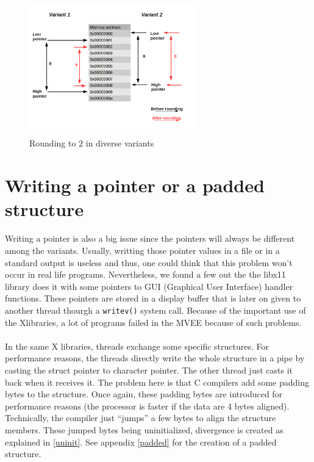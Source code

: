 \documentclass[english]{enstaPRE}
\begin{document}
\begin{figure}[t, centering]
 \centerline{\includegraphics[width=0.65\textwidth]{RoundUpMemory}}
 \caption{Rounding to 2 in diverse variants}
 \label{fig:rounding}
\end{figure}


\section{Writing a pointer or a padded structure}

Writing a pointer is also a big issue since the pointers will always be different among the variants.
Usually, writting those pointer values in a file or in a standard output is useless and thus, one could think that this problem won't occur in
real life programs. Nevertheless, we found a few out the the libx11 library does it with some pointers to GUI 
(Graphical User Interface) handler functions. These pointers are stored in a display buffer that is later on given to another thread 
thourgh a \texttt{writev()} system call.
Because of the important use of the Xlibraries, a lot of programs failed in the MVEE because of such problems.
\\ \\
In the same X libraries, threads exchange some specific structures. For performance reasons, the threads directly write the whole 
structure in a pipe by casting the struct pointer to character pointer. The other thread just casts it back when it receives it.
The problem here is that C compilers add some padding bytes to the structure. Once again, these padding bytes are introduced for performance
reasons (the processor is faster if the data are 4 bytes aligned). Technically, the compiler just ``jumps'' a few bytes to align 
the structure members. These jumped bytes being uninitialized, divergence is created as explained in \ref{uninit}. See appendix \ref{padded} for the creation of a padded structure.
\\ \\ \\
\end{document}
